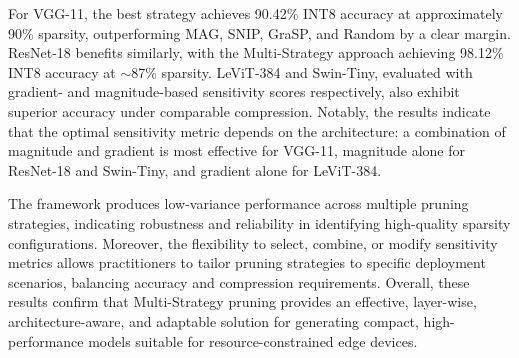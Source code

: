 \documentclass[11pt, conference]{IEEEtran}
\begin{document}
For VGG-11, the best strategy achieves 90.42\% INT8 accuracy at approximately 90\% sparsity, outperforming MAG, SNIP, GraSP, and Random by a clear margin. ResNet-18 benefits similarly, with the Multi-Strategy approach achieving 98.12\% INT8 accuracy at $\sim$87\% sparsity. LeViT-384 and Swin-Tiny, evaluated with gradient- and magnitude-based sensitivity scores respectively, also exhibit superior accuracy under comparable compression. Notably, the results indicate that the optimal sensitivity metric depends on the architecture: a combination of magnitude and gradient is most effective for VGG-11, magnitude alone for ResNet-18 and Swin-Tiny, and gradient alone for LeViT-384.  

The framework produces low-variance performance across multiple pruning strategies, indicating robustness and reliability in identifying high-quality sparsity configurations. Moreover, the flexibility to select, combine, or modify sensitivity metrics allows practitioners to tailor pruning strategies to specific deployment scenarios, balancing accuracy and compression requirements. Overall, these results confirm that Multi-Strategy pruning provides an effective, layer-wise, architecture-aware, and adaptable solution for generating compact, high-performance models suitable for resource-constrained edge devices.




\end{document}
